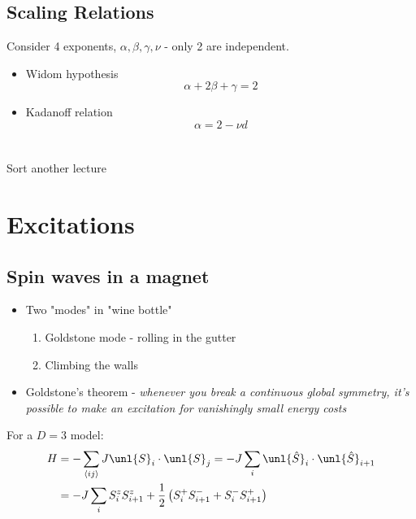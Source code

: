 \documentclass[a4paper, 11pt, normalem]{report}
\begin{document}
\section{Scaling Relations}
Consider 4 exponents, $\alpha, \beta, \gamma, \nu$ - only 2 are independent.
\begin{itemize}
    \item Widom hypothesis
        \begin{equation}
            \alpha + 2\beta + \gamma = 2
        \end{equation}
    \item Kadanoff relation
        \begin{equation}
            \alpha = 2 - \nu d
        \end{equation}
\end{itemize}

\chapter{}

Sort another lecture

\chapter{Excitations}
\section{Spin waves in a magnet}
\begin{itemize}
    \item Two "modes" in "wine bottle"
        \begin{enumerate}
            \item Goldstone mode - rolling in the gutter
            \item Climbing the walls
        \end{enumerate}
    \item Goldstone's theorem - \emph{whenever you break a continuous global symmetry, it's possible to make an excitation for vanishingly small energy costs}
\end{itemize}
For a $D=3$ model:
\begin{align}
    H &= -\sum_{\langle ij\rangle} J\unl{S}_i\cdot\unl{S}_j = -J\sum_i \unl{\hat{S}}_i\cdot\unl{\hat{S}}_{i+1} \\
      &= -J\sum_i S_i^z S_{i+1}^z + \frac{1}{2} \left(S_i^+S_{i+1}^- + S_i^-S_{i+1}^+\right)
\end{align}
\end{document}

